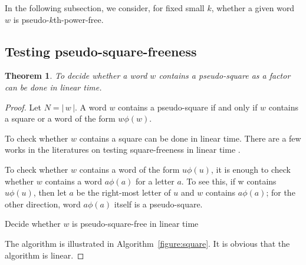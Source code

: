 \documentclass[12pt]{article}
\def\abs#1{{|\,#1\,|}}
\newtheorem{theorem}{Theorem}
\begin{document}
In the following subsection, we consider, for fixed small $k$,
whether a given word $w$ is pseudo-$k$th-power-free.


\subsection{Testing pseudo-square-freeness}
\begin{theorem}
To decide whether a word $w$ contains a pseudo-square as a factor
can be done in linear time.
\end{theorem}
\begin{proof}
Let $N=\abs{w}$. A word $w$ contains a pseudo-square if and only if
$w$ contains a square or a word of the form $w\phi(w)$.

To check whether $w$ contains a square can be done in linear time.
There are a few works in the literatures on testing square-freeness
in linear time \cite{Crochemore1983,Main&Lorentz1985}.

To check whether $w$ contains a word of the form $u\phi(u)$, it is
enough to check whether $w$ contains a word $a\phi(a)$ for a letter
$a$. To see this, if w contains $u\phi(u)$, then let $a$ be the
right-most letter of $u$ and $w$ contains $a\phi(a)$; for the other
direction, word $a\phi(a)$ itself is a pseudo-square.

\begin{algorithm}
  \SetLine {}   
  \linesnumbered
  \;
  \;
  \caption{Decide whether $w$ is pseudo-square-free in linear time}
  \label{figure:square}
\end{algorithm}

The algorithm is illustrated in Algorithm~\ref{figure:square}. It is
obvious that the algorithm is linear.
\end{proof}
\end{document}
